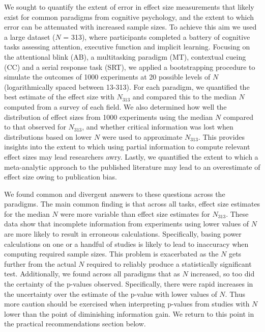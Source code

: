 \documentclass{article}
\begin{document}
We sought to quantify the extent of error in effect size measurements that likely exist for common paradigms from cognitive psychology, and the extent to which error can be attenuated with increased sample sizes. To achieve this aim we used a large dataset (\(N\) = 313), where participants completed a battery of cognitive tasks assessing attention, executive function and implicit learning. Focusing on the attentional blink (AB), a multitasking paradigm (MT), contextual cueing (CC) and a serial response task (SRT), we applied a bootstrapping procedure to simulate the outcomes of 1000 experiments at 20 possible levels of \(N\) (logarithmically spaced between 13-313). For each paradigm, we quantified the best estimate of the effect size with \(N_{313}\) and compared this to the median \(N\) computed from a survey of each field. We also determined how well the distribution of effect sizes from 1000 experiments using the median \(N\) compared to that observed for \(N_{313}\), and whether critical information was lost when distributions based on lower \(N\) were used to approximate \(N_{313}\). This provides insights into the extent to which using partial information to compute relevant effect sizes may lead researchers awry. Lastly, we quantified the extent to which a meta-analytic approach to the published literature may lead to an overestimate of effect size owing to publication bias.

We found common and divergent answers to these questions across the paradigms. The main common finding is that across all tasks, effect size estimates for the median \(N\) were more variable than effect size estimates for \(N_{313}\). These data show that incomplete information from experiments using lower values of \(N\) are more likely to result in erroneous calculations. Specifically, basing power calculations on one or a handful of studies is likely to lead to inaccuracy when computing required sample sizes. This problem is exacerbated as the \(N\) gets further from the actual \(N\) required to reliably produce a statistically significant test. Additionally, we found across all paradigms that as \(N\) increased, so too did the certainty of the p-values observed. Specifically, there were rapid increases in the uncertainty over the estimate of the p-value with lower values of \(N\). Thus more caution should be exercised when interpreting p-values from studies with \(N\) lower than the point of diminishing information gain. We return to this point in the practical recommendations section below.
\end{document}
